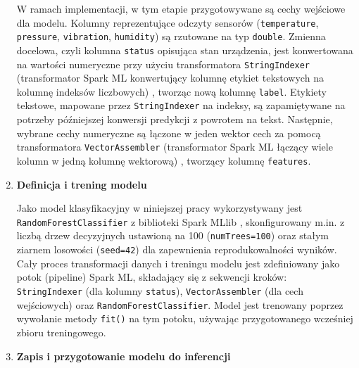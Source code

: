 \begin{enumerate}
W ramach implementacji, w tym etapie przygotowywane są cechy wejściowe dla modelu. Kolumny reprezentujące odczyty sensorów (\texttt{temperature}, \texttt{pressure}, \texttt{vibration}, \texttt{humidity}) są rzutowane na typ \texttt{double}. Zmienna docelowa, czyli kolumna \texttt{status} opisująca stan urządzenia, jest konwertowana na wartości numeryczne przy użyciu transformatora \texttt{StringIndexer} (transformator Spark ML konwertujący kolumnę etykiet tekstowych na kolumnę indeksów liczbowych) \cite{spark_mllib_reference}, tworząc nową kolumnę \texttt{label}. Etykiety tekstowe, mapowane przez \texttt{StringIndexer} na indeksy, są zapamiętywane na potrzeby późniejszej konwersji predykcji z powrotem na tekst. Następnie, wybrane cechy numeryczne są łączone w jeden wektor cech za pomocą transformatora \texttt{VectorAssembler} (transformator Spark ML łączący wiele kolumn w jedną kolumnę wektorową) \cite{spark_mllib_reference} , tworzący kolumnę \texttt{features}.

    \item \textbf{Definicja i trening modelu}

Jako model klasyfikacyjny w niniejszej pracy wykorzystywany jest \texttt{RandomForestClassifier} z biblioteki Spark MLlib \cite{spark_mllib_reference}, skonfigurowany m.in. z liczbą drzew decyzyjnych ustawioną na 100 (\texttt{numTrees=100}) oraz stałym ziarnem losowości (\texttt{seed=42}) dla zapewnienia reprodukowalności wyników. Cały proces transformacji danych i treningu modelu jest zdefiniowany jako potok (pipeline) Spark ML, składający się z sekwencji kroków: \texttt{StringIndexer} (dla kolumny \texttt{status}), \texttt{VectorAssembler} (dla cech wejściowych) oraz \texttt{RandomForestClassifier}. Model jest trenowany poprzez wywołanie metody \texttt{fit()} na tym potoku, używając przygotowanego wcześniej zbioru treningowego.

    \item \textbf{Zapis i przygotowanie modelu do inferencji}


\end{enumerate}
